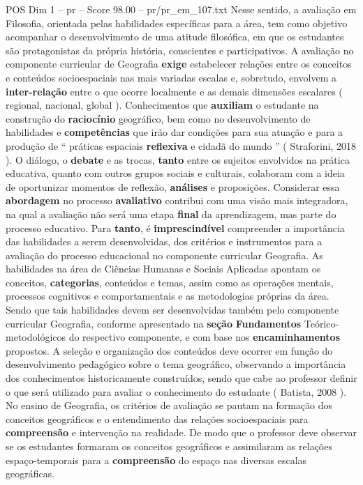 \begin{textsample}{POS Dim 1 – pr – Score 98.00 – pr/pr\_em\_107.txt}
Nesse sentido, a avaliação em Filosofia, orientada pelas habilidades específicas para a área, tem como objetivo acompanhar o desenvolvimento de uma atitude filosófica, em que os estudantes são protagonistas da própria história, conscientes e participativos.
A avaliação no componente curricular de Geografia \textbf{exige} estabelecer relações entre os conceitos e conteúdos socioespaciais nas mais variadas escalas e, sobretudo, envolvem a \textbf{inter-relação} entre o que ocorre localmente e as demais dimensões escalares ( regional, nacional, global ).
Conhecimentos que \textbf{auxiliam} o estudante na construção do \textbf{raciocínio} geográfico, bem como no desenvolvimento de habilidades e \textbf{competências} que irão dar condições para sua atuação e para a produção de “ práticas espaciais \textbf{reflexiva} e cidadã do mundo ” ( Straforini, 2018 ).
O diálogo, o \textbf{debate} e as trocas, \textbf{tanto} entre os sujeitos envolvidos na prática educativa, quanto com outros grupos sociais e culturais, colaboram com a ideia de oportunizar momentos de reflexão, \textbf{análises} e proposições.
Considerar essa \textbf{abordagem} no processo \textbf{avaliativo} contribui com uma visão mais integradora, na qual a avaliação não será uma etapa \textbf{final} da aprendizagem, mas parte do processo educativo.
Para \textbf{tanto}, é \textbf{imprescindível} compreender a importância das habilidades a serem desenvolvidas, dos critérios e instrumentos para a avaliação do processo educacional no componente curricular Geografia.
As habilidades na área de Ciências Humanas e Sociais Aplicadas apontam os conceitos, \textbf{categorias}, conteúdos e temas, assim como as operações mentais, processos cognitivos e comportamentais e as metodologias próprias da área.
Sendo que tais habilidades devem ser desenvolvidas também pelo componente curricular Geografia, conforme apresentado na \textbf{seção} \textbf{Fundamentos} Teórico-metodológicos do respectivo componente, e com base nos \textbf{encaminhamentos} propostos.
A seleção e organização dos conteúdos deve ocorrer em função do desenvolvimento pedagógico sobre o tema geográfico, observando a importância dos conhecimentos historicamente construídos, sendo que cabe ao professor definir o que será utilizado para avaliar o conhecimento do estudante ( Batista, 2008 ).
No ensino de Geografia, os critérios de avaliação se pautam na formação dos conceitos geográficos e o entendimento das relações socioespaciais para \textbf{compreensão} e intervenção na realidade.
De modo que o professor deve observar se os estudantes formaram os conceitos geográficos e assimilaram as relações espaço-temporais para a \textbf{compreensão} do espaço nas diversas escalas geográficas.

\end{textsample}
